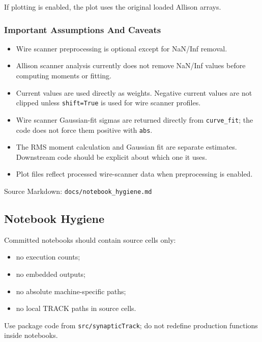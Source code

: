 \documentclass[
]{article}
\providecommand{\tightlist}{%
  \setlength{\itemsep}{0pt}\setlength{\parskip}{0pt}}
\begin{document}
If plotting is enabled, the plot uses the original loaded Allison
arrays.

\hypertarget{important-assumptions-and-caveats}{%
\subsubsection{Important Assumptions And
Caveats}\label{important-assumptions-and-caveats}}

\begin{itemize}
\tightlist
\item
  Wire scanner preprocessing is optional except for NaN/Inf removal.
\item
  Allison scanner analysis currently does not remove NaN/Inf values
  before computing moments or fitting.
\item
  Current values are used directly as weights. Negative current values
  are not clipped unless \texttt{shift=True} is used for wire scanner
  profiles.
\item
  Wire scanner Gaussian-fit sigmas are returned directly from
  \texttt{curve\_fit}; the code does not force them positive with
  \texttt{abs}.
\item
  The RMS moment calculation and Gaussian fit are separate estimates.
  Downstream code should be explicit about which one it uses.
\item
  Plot files reflect processed wire-scanner data when preprocessing is
  enabled.
\end{itemize}

Source Markdown: \texttt{docs/notebook\_hygiene.md}

\hypertarget{notebook-hygiene}{%
\subsection{Notebook Hygiene}\label{notebook-hygiene}}

Committed notebooks should contain source cells only:

\begin{itemize}
\tightlist
\item
  no execution counts;
\item
  no embedded outputs;
\item
  no absolute machine-specific paths;
\item
  no local TRACK paths in source cells.
\end{itemize}

Use package code from \texttt{src/synapticTrack}; do not redefine
production functions inside notebooks.
\end{document}
